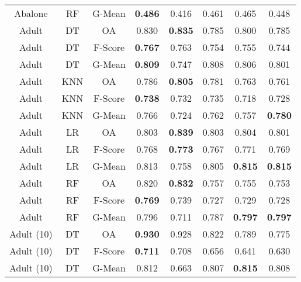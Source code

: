 \begin{longtable}{cccccccc}
           Abalone &         RF &  G-Mean & \textbf{0.486} &          0.416 &          0.461 &          0.465 &          0.448 \\
             Adult &         DT &      OA &          0.830 & \textbf{0.835} &          0.785 &          0.800 &          0.785 \\
             Adult &         DT & F-Score & \textbf{0.767} &          0.763 &          0.754 &          0.755 &          0.744 \\
             Adult &         DT &  G-Mean & \textbf{0.809} &          0.747 &          0.808 &          0.806 &          0.801 \\
             Adult &        KNN &      OA &          0.786 & \textbf{0.805} &          0.781 &          0.763 &          0.761 \\
             Adult &        KNN & F-Score & \textbf{0.738} &          0.732 &          0.735 &          0.718 &          0.728 \\
             Adult &        KNN &  G-Mean &          0.766 &          0.724 &          0.762 &          0.757 & \textbf{0.780} \\
             Adult &         LR &      OA &          0.803 & \textbf{0.839} &          0.803 &          0.804 &          0.801 \\
             Adult &         LR & F-Score &          0.768 & \textbf{0.773} &          0.767 &          0.771 &          0.769 \\
             Adult &         LR &  G-Mean &          0.813 &          0.758 &          0.805 & \textbf{0.815} & \textbf{0.815} \\
             Adult &         RF &      OA &          0.820 & \textbf{0.832} &          0.757 &          0.755 &          0.753 \\
             Adult &         RF & F-Score & \textbf{0.769} &          0.739 &          0.727 &          0.729 &          0.728 \\
             Adult &         RF &  G-Mean &          0.796 &          0.711 &          0.787 & \textbf{0.797} & \textbf{0.797} \\
        Adult (10) &         DT &      OA & \textbf{0.930} &          0.928 &          0.822 &          0.789 &          0.775 \\
        Adult (10) &         DT & F-Score & \textbf{0.711} &          0.708 &          0.656 &          0.641 &          0.630 \\
        Adult (10) &         DT &  G-Mean &          0.812 &          0.663 &          0.807 & \textbf{0.815} &          0.808 \\

\end{longtable}
